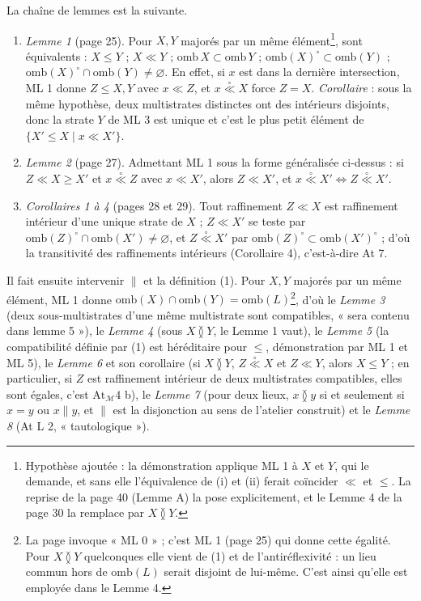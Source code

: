 \documentclass[11pt,a4paper]{article}
\begin{document}
La chaîne de lemmes est la suivante.
\begin{enumerate}
\item[] \emph{Lemme 1} (page 25). Pour $X, Y$ majorés par un même
élément\footnote{Hypothèse ajoutée : la démonstration applique ML 1 à $X$ et $Y$,
qui le demande, et sans elle l'équivalence de (i) et (ii) ferait coïncider $\ll$ et
$\leq$. La reprise de la page 40 (Lemme A) la pose explicitement, et le Lemme 4
de la page 30 la remplace par $X \between Y$.}, sont équivalents : $X \leq Y$ ; $X
\ll Y$ ; $\mathrm{omb}\, X \subset \mathrm{omb}\, Y$ ;
$\mathrm{omb}(X)^{\circ} \subset \mathrm{omb}(Y)$ ;
$\mathrm{omb}(X)^{\circ} \cap \mathrm{omb}(Y) \neq \varnothing$. En effet, si
$x$ est dans la dernière intersection, ML 1 donne $Z \leq X, Y$ avec $x \ll Z$,
et $x \mathrel{\overset{\circ}{\ll}} X$ force $Z = X$. \emph{Corollaire} : sous la
même hypothèse, deux multistrates distinctes ont des intérieurs disjoints, donc
la strate $Y$ de ML 3 est unique et c'est le plus petit élément de
$\{X' \leq X \mid x \ll X'\}$.
\item[] \emph{Lemme 2} (page 27). Admettant ML 1 sous la forme généralisée
ci-dessus : si $Z \ll X \geq X'$ et $x \mathrel{\overset{\circ}{\ll}} Z$ avec $x \ll
X'$, alors $Z \ll X'$, et $x \mathrel{\overset{\circ}{\ll}} X' \iff Z
\mathrel{\overset{\circ}{\ll}} X'$.
\item[] \emph{Corollaires 1 à 4} (pages 28 et 29). Tout raffinement $Z \ll X$ est
raffinement intérieur d'une unique strate de $X$ ; $Z \ll X'$ se teste par
$\mathrm{omb}(Z)^{\circ} \cap \mathrm{omb}(X') \neq \varnothing$, et $Z
\mathrel{\overset{\circ}{\ll}} X'$ par $\mathrm{omb}(Z)^{\circ} \subset
\mathrm{omb}(X')^{\circ}$ ; d'où la transitivité des raffinements intérieurs
(Corollaire 4), c'est-à-dire At 7.
\end{enumerate}
Il fait ensuite intervenir $\parallel$ et la définition (1). Pour $X, Y$ majorés par
un même élément, ML 1 donne $\mathrm{omb}(X) \cap \mathrm{omb}(Y) =
\mathrm{omb}(L)$\footnote{La page invoque « ML 0 » ; c'est ML 1 (page 25) qui
donne cette égalité. Pour $X \between Y$ quelconques elle vient de (1) et de
l'antiréflexivité : un lieu commun hors de $\mathrm{omb}(L)$ serait disjoint de
lui-même. C'est ainsi qu'elle est employée dans le Lemme 4.}, d'où le
\emph{Lemme 3} (deux sous-multistrates d'une même multistrate sont compatibles,
« sera contenu dans lemme 5 »), le \emph{Lemme 4} (sous $X \between Y$, le Lemme 1
vaut), le \emph{Lemme 5} (la compatibilité définie par (1) est héréditaire pour
$\leq$, démonstration par ML 1 et ML 5), le \emph{Lemme 6} et son corollaire
(si $X \between Y$, $Z \mathrel{\overset{\circ}{\ll}} X$ et $Z \ll Y$, alors $X \leq
Y$ ; en particulier, si $Z$ est raffinement intérieur de deux multistrates
compatibles, elles sont égales, c'est $\mathrm{At}_{\mathcal{M}} 4$ b), le \emph{Lemme 7} (pour deux lieux,
$x \between y$ si et seulement si $x = y$ ou $x \parallel y$, et $\parallel$ est la
disjonction au sens de l'atelier construit) et le \emph{Lemme 8} (At L 2,
« tautologique »).
\end{document}
